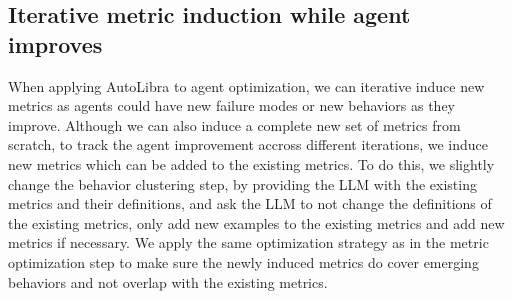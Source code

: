 \subsection{Iterative metric induction while agent improves}
\label{sec:iterative-induction}
When applying AutoLibra to agent optimization, we can iterative induce new metrics as agents could
have new failure modes or new behaviors as they improve.
Although we can also induce a complete new set of metrics from scratch, to track the agent improvement
accross different iterations, we induce new metrics which can be added to the existing metrics.
To do this, we slightly change the behavior clustering step, by providing the LLM with the existing metrics
and their definitions, and ask the LLM to not change the definitions of the existing metrics, 
only add new examples to the existing metrics and add new metrics if necessary.
We apply the same optimization strategy as in the metric optimization step
to make sure the newly induced metrics do cover emerging behaviors and not overlap with the existing metrics.